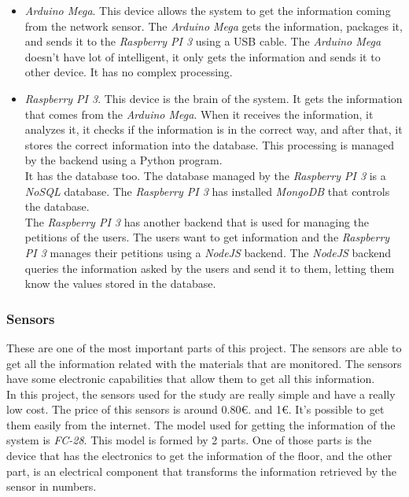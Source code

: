 \begin{itemize}

\item \textit{Arduino Mega}. This device allows the system to get the information coming from the network sensor. The \textit{Arduino Mega} gets the information, packages it, and sends it to the \textit{Raspberry PI 3} using a USB cable. The \textit{Arduino Mega} doesn't have lot of intelligent, it only gets the information and sends it to other device. It has no complex processing.\\

\item \textit{Raspberry PI 3}. This device is the brain of the system. It gets the information that comes from the \textit{Arduino Mega}. When it receives the information, it analyzes it, it checks if the information is in the correct way, and after that, it stores the correct information into the database. This processing is managed by the backend using a Python program.\\

It has the database too. The database managed by the \textit{Raspberry PI 3} is a \textit{NoSQL} database. The \textit{Raspberry PI 3} has installed \textit{MongoDB} that controls the database.\\

The \textit{Raspberry PI 3} has another backend that is used for managing the petitions of the users. The users want to get information and the \textit{Raspberry PI 3} manages their petitions using a \textit{NodeJS} backend. The \textit{NodeJS} backend queries the information asked by the users and send it to them, letting them know the values stored in the database.

\end{itemize}

\subsubsection{Sensors}

These are one of the most important parts of this project. The sensors are able to get all the information related with the materials that are monitored. The sensors have some electronic capabilities that allow them to get all this information.\\

In this project, the sensors used for the study are really simple and have a really low cost. The price of this sensors is around 0.80\euro . and 1\euro . It's possible to get them easily from the internet. The model used for getting the information of the system is \textit{FC-28}. This model is formed by 2 parts. One of those parts is the device that has the electronics to get the information of the floor, and the other part, is an electrical component that transforms the information retrieved by the sensor in numbers.\\


